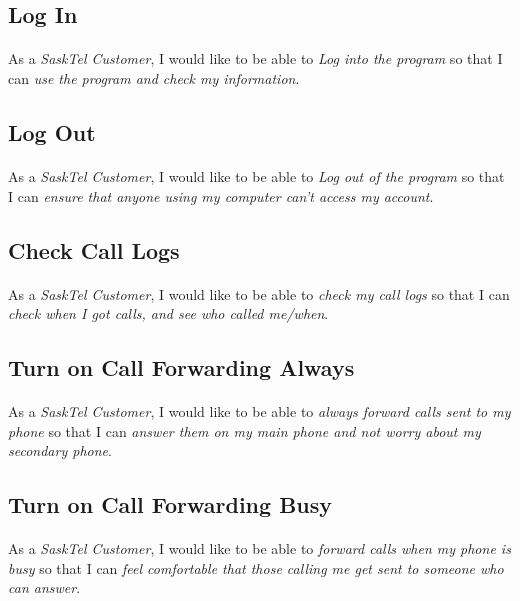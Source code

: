 \documentclass[12pt]{article}
\begin{document}
\subsection{Log In}
\paragraph{}	As a \textit{SaskTel Customer}, I would like to be able to \textit{Log into the program} so that I can \textit{use the program and check my information}.

\subsection{Log Out}
\paragraph{}	As a \textit{SaskTel Customer}, I would like to be able to \textit{Log out of the program} so that I can \textit{ensure that anyone using my computer can't access my account}.

\subsection{Check Call Logs}
\paragraph{}	As a \textit{SaskTel Customer}, I would like to be able to \textit{check my call logs} so that I can \textit{check when I got calls, and see who called me/when}.

\subsection{Turn on Call Forwarding Always}
\paragraph{}	As a \textit{SaskTel Customer}, I would like to be able to \textit{always forward calls sent to my phone} so that I can \textit{answer them on my main phone and not worry about my secondary phone}.

\subsection{Turn on Call Forwarding Busy}
\paragraph{}	As a \textit{SaskTel Customer}, I would like to be able to \textit{forward calls when my phone is busy} so that I can \textit{feel comfortable that those calling me get sent to someone who can answer}.
\end{document}
